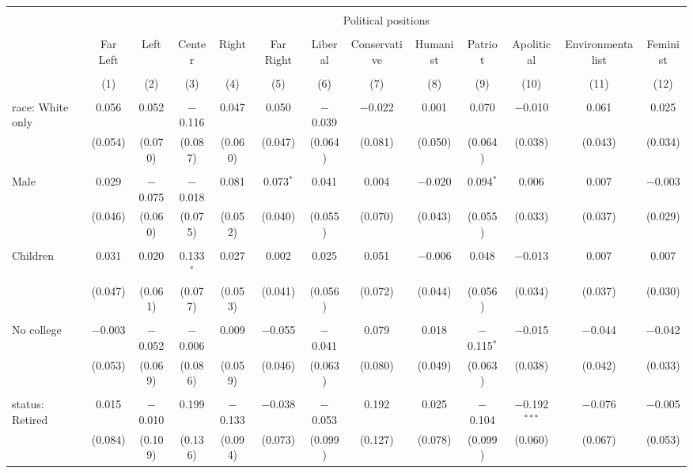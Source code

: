 
\begin{tabular}{@{\extracolsep{5pt}}lcccccccccccc} 
\\[-1.8ex]\hline 
\hline \\[-1.8ex] 
 & \multicolumn{12}{c}{Political positions} \\ 
\cline{2-13} 
\\[-1.8ex] & Far Left & Left & Center & Right & Far Right & Liberal & Conservative & Humanist & Patriot & Apolitical & Environmentalist & Feminist \\ 
\\[-1.8ex] & (1) & (2) & (3) & (4) & (5) & (6) & (7) & (8) & (9) & (10) & (11) & (12)\\ 
\hline \\[-1.8ex] 
 race: White only & 0.056 & 0.052 & $-$0.116 & 0.047 & 0.050 & $-$0.039 & $-$0.022 & 0.001 & 0.070 & $-$0.010 & 0.061 & 0.025 \\ 
  & (0.054) & (0.070) & (0.087) & (0.060) & (0.047) & (0.064) & (0.081) & (0.050) & (0.064) & (0.038) & (0.043) & (0.034) \\ 
  & & & & & & & & & & & & \\ 
 Male & 0.029 & $-$0.075 & $-$0.018 & 0.081 & 0.073$^{*}$ & 0.041 & 0.004 & $-$0.020 & 0.094$^{*}$ & 0.006 & 0.007 & $-$0.003 \\ 
  & (0.046) & (0.060) & (0.075) & (0.052) & (0.040) & (0.055) & (0.070) & (0.043) & (0.055) & (0.033) & (0.037) & (0.029) \\ 
  & & & & & & & & & & & & \\ 
 Children & 0.031 & 0.020 & 0.133$^{*}$ & 0.027 & 0.002 & 0.025 & 0.051 & $-$0.006 & 0.048 & $-$0.013 & 0.007 & 0.007 \\ 
  & (0.047) & (0.061) & (0.077) & (0.053) & (0.041) & (0.056) & (0.072) & (0.044) & (0.056) & (0.034) & (0.037) & (0.030) \\ 
  & & & & & & & & & & & & \\ 
 No college & $-$0.003 & $-$0.052 & $-$0.006 & 0.009 & $-$0.055 & $-$0.041 & 0.079 & 0.018 & $-$0.115$^{*}$ & $-$0.015 & $-$0.044 & $-$0.042 \\ 
  & (0.053) & (0.069) & (0.086) & (0.059) & (0.046) & (0.063) & (0.080) & (0.049) & (0.063) & (0.038) & (0.042) & (0.033) \\ 
  & & & & & & & & & & & & \\ 
 status: Retired & 0.015 & $-$0.010 & 0.199 & $-$0.133 & $-$0.038 & $-$0.053 & 0.192 & 0.025 & $-$0.104 & $-$0.192$^{***}$ & $-$0.076 & $-$0.005 \\ 
  & (0.084) & (0.109) & (0.136) & (0.094) & (0.073) & (0.099) & (0.127) & (0.078) & (0.099) & (0.060) & (0.067) & (0.053) \\ 

\end{tabular}
